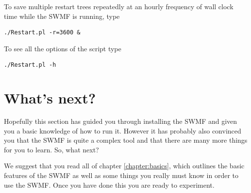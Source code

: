 To save multiple restart trees repeatedly at an hourly frequency of 
wall clock time while the SWMF is running, type
\begin{verbatim}
./Restart.pl -r=3600 &
\end{verbatim}
To see all the options of the script type
\begin{verbatim}
./Restart.pl -h
\end{verbatim}

\section{What's next?}

Hopefully this section has guided you through installing the SWMF and
given you a basic knowledge of how to run it.  However it has probably
also convinced you that the SWMF is quite a complex tool and that there
are many more things for you to learn.  So, what next?

We suggest that you read all of chapter \ref{chapter:basics}, which
outlines the basic features of the SWMF as well as some things you
really must know in order to use the SWMF.  Once you have done this you
are ready to experiment.

%
